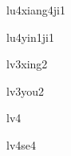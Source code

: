 \begin{multicols}{2}
\begin{hanzi}[录像机]{lu4xiang4ji1}
\end{hanzi}

\begin{hanzi}[录音机]{lu4yin1ji1}
\end{hanzi}

\begin{hanzi}[旅行]{lv3xing2}
\end{hanzi}

\begin{hanzi}[旅游]{lv3you2}
\end{hanzi}

\begin{hanzi}[绿]{lv4}
\end{hanzi}

\begin{hanzi}[绿色]{lv4se4}
\end{hanzi}

\end{multicols}
